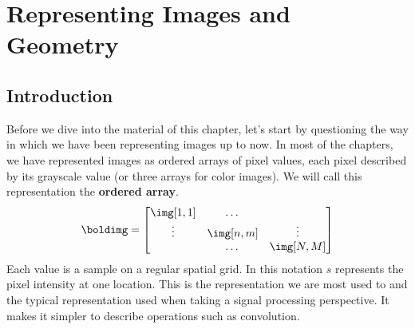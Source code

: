 \chapter{Representing Images and Geometry}
\label{chapter:geometry_homogeneous}






\section{Introduction}


Before we dive into the material of this chapter, let's start by questioning the way in which we have been representing images up to now. In most of the chapters, we have represented images as ordered arrays of pixel values, each pixel described by its grayscale value (or three arrays for color images). We will call this representation the {\bf ordered array}.
\begin{equation}
\boldimg = 
\left[
\begin{matrix}
\img [1,1] & \dots & \\
\vdots & \img [n,m] & \vdots \\
 & \dots  & \img [N,M] \\
\end{matrix}
\right]
\end{equation}
Each value is a sample on a regular spatial grid. In this notation $s$ represents the pixel intensity at one location. This is the representation we are most used to and the typical representation used when taking a signal processing perspective. It makes it simpler to describe operations such as convolution.

